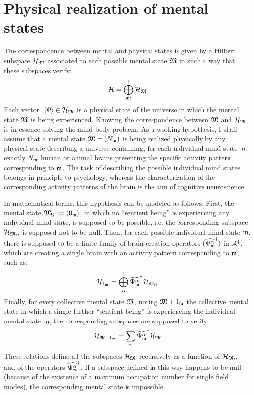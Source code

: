 \documentclass[10pt,a4paper,twoside,openany]{book}
\begin{document}
\section{Physical realization of mental states}

The correspondence between mental and physical states is given by a Hilbert subspace $\mathcal H_{\mathfrak{M}}$ associated to each possible mental state $\mathfrak{M}$ in such a way that these subspaces verify:
\begin{equation*}
\mathcal H = \bigoplus_{\mathfrak{M}}^\perp \mathcal H_{\mathfrak{M}}
\end{equation*}
Each vector $\ \left|{\Psi}\right\rangle \in \mathcal H_{\mathfrak{M}}$ is a physical state of the universe in which the mental state $\mathfrak{M}$ is being experienced. Knowing the correspondence between $\mathfrak{M}$ and $\mathcal H_{\mathfrak{M}}$ is in essence solving the mind-body problem. As a working hypothesis, I shall assume that a mental state $\mathfrak{M} = ({N}_{\mathfrak{m}})$ is being realized physically by any physical state describing a universe containing, for each individual mind state $\mathfrak{m}$, exactly ${N}_{\mathfrak{m}}$ human or animal brains presenting the specific activity pattern corresponding to $\mathfrak{m}$. The task of describing the possible individual mind states belongs in principle to psychology, whereas the characterization of the corresponding activity patterns of the brain is the aim of cognitive neuroscience.

In mathematical terms, this hypothesis can be modeled as follows. First, the mental state $\mathfrak{M}_\Omega := ({0}_{\mathfrak{m}})$, in which no ``sentient being'' is experiencing any individual mind state, is supposed to be possible, i.e. the corresponding subspace $\mathcal H_{\mathfrak{M}_\Omega}$ is supposed not to be null. Then, for each possible individual mind state $\mathfrak{m}$, there is supposed to be a finite family of brain creation operators $(\widehat{\Psi_{\mathfrak{m}}^\alpha}^{\dagger})$ in $\mathcal A^{\dagger}$, which are creating a single brain with an activity pattern corresponding to $\mathfrak{m}$, such as:
\begin{equation*}
\mathcal H_{{1}_{\mathfrak{m}}} = \bigoplus_{\alpha}^\perp \widehat{\Psi_{\mathfrak{m}}^\alpha}^{\dagger} \mathcal H_{\mathfrak{M}_\Omega}
\end{equation*}
Finally, for every collective mental state $\mathfrak{M}$, noting $\mathfrak{M} + {1}_{\mathfrak{m}}$ the collective mental state in which a single further ``sentient being'' is experiencing the individual mental state $\mathfrak{m}$, the corresponding subspaces are supposed to verify:
\begin{equation*}
\mathcal H_{\mathfrak{M} + {1}_{\mathfrak{m}}} = \sum_{\alpha} \widehat{\Psi_{\mathfrak{m}}^\alpha}^{\dagger} \mathcal H_{\mathfrak{M}}
\end{equation*}
These relations define all the subspaces $\mathcal H_{\mathfrak{M}}$ recursively as a function of $\mathcal H_{\mathfrak{M}_\Omega}$ and of the operators $\widehat{\Psi_{\mathfrak{m}}^\alpha}^{\dagger}$. If a subspace defined in this way happens to be null (because of the existence of a maximum occupation number for single field modes), the corresponding mental state is impossible.
\end{document}
